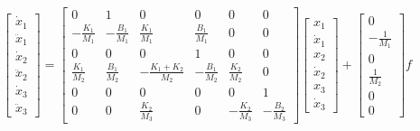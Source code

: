 \documentclass[letterpaper,11pt]{article}
\begin{document}
\[
\begin{bmatrix}
\dot{x}_1 \\
\ddot{x}_1 \\
\dot{x}_2 \\
\ddot{x}_2 \\
\dot{x}_3 \\
\ddot{x}_3
\end{bmatrix}
=
\begin{bmatrix}
0 & 1 & 0 & 0 & 0 & 0 \\
-\frac{K_1}{M_1} & -\frac{B_1}{M_1} & \frac{K_1}{M_1} & \frac{B_1}{M_1} & 0 & 0 \\
0 & 0 & 0 & 1 & 0 & 0 \\
\frac{K_1}{M_2} & \frac{B_1}{M_2} & -\frac{K_1+K_2}{M_2} & -\frac{B_1}{M_2} & \frac{K_2}{M_2} & 0 \\
0 & 0 & 0 & 0 & 0 & 1 \\
0 & 0 & \frac{K_2}{M_3} & 0 & -\frac{K_2}{M_3} & -\frac{B_2}{M_3}
\end{bmatrix}
\begin{bmatrix}
x_1 \\
\dot{x}_1 \\
x_2 \\
\dot{x}_2 \\
x_3 \\
\dot{x}_3
\end{bmatrix}
+
\begin{bmatrix}
0 \\
-\frac{1}{M_1} \\
0 \\
\frac{1}{M_2} \\
0 \\
0
\end{bmatrix}
f
\]

%

\end{document}
